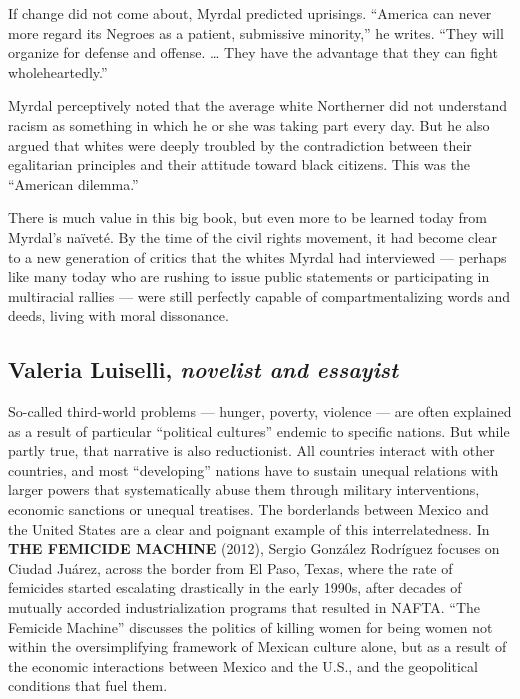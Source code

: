 If change did not come about, Myrdal predicted uprisings. ``America can
never more regard its Negroes as a patient, submissive minority,'' he
writes. ``They will organize for defense and offense. \ldots{} They have
the advantage that they can fight wholeheartedly.''

Myrdal perceptively noted that the average white Northerner did not
understand racism as something in which he or she was taking part every
day. But he also argued that whites were deeply troubled by the
contradiction between their egalitarian principles and their attitude
toward black citizens. This was the ``American dilemma.''

There is much value in this big book, but even more to be learned today
from Myrdal's naïveté. By the time of the civil rights movement, it had
become clear to a new generation of critics that the whites Myrdal had
interviewed --- perhaps like many today who are rushing to issue public
statements or participating in multiracial rallies --- were still
perfectly capable of compartmentalizing words and deeds, living with
moral dissonance.

\hypertarget{valeria-luiselli-novelist-and-essayist}{%
\subsection{\texorpdfstring{Valeria Luiselli, \emph{novelist and
essayist}}{Valeria Luiselli, novelist and essayist}}\label{valeria-luiselli-novelist-and-essayist}}

So-called third-world problems --- hunger, poverty, violence --- are
often explained as a result of particular ``political cultures'' endemic
to specific nations. But while partly true, that narrative is also
reductionist. All countries interact with other countries, and most
``developing'' nations have to sustain unequal relations with larger
powers that systematically abuse them through military interventions,
economic sanctions or unequal treatises. The borderlands between Mexico
and the United States are a clear and poignant example of this
interrelatedness. In \textbf{THE FEMICIDE MACHINE} (2012), Sergio
González Rodríguez focuses on Ciudad Juárez, across the border from El
Paso, Texas, where the rate of femicides started escalating drastically
in the early 1990s, after decades of mutually accorded industrialization
programs that resulted in NAFTA. ``The Femicide Machine'' discusses the
politics of killing women for being women not within the oversimplifying
framework of Mexican culture alone, but as a result of the economic
interactions between Mexico and the U.S., and the geopolitical
conditions that fuel them.

